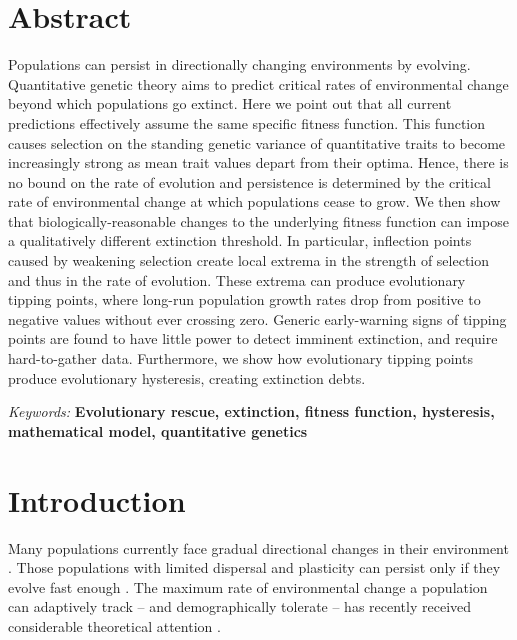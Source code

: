 \documentclass[12pt,letterpaper]{article} %
\begin{document}
\doublespacing
\linenumbers

\newpage
\setcounter{page}{1}
\pagestyle{fancy}

\normalsize

\section*{Abstract} %


Populations can persist in directionally changing environments by evolving. Quantitative genetic theory aims to predict critical rates of environmental change beyond which populations go extinct. Here we point out that all current predictions effectively assume the same specific fitness function. This function causes selection on the standing genetic variance of quantitative traits to become increasingly strong as mean trait values depart from their optima. Hence, there is no bound on the rate of evolution and persistence is determined by the critical rate of environmental change at which populations cease to grow. We then show that biologically-reasonable changes to the underlying fitness function can impose a qualitatively different extinction threshold. In particular, inflection points caused by weakening selection create local extrema in the strength of selection and thus in the rate of evolution. These extrema can produce evolutionary tipping points, where long-run population growth rates drop from positive to negative values without ever crossing zero. Generic early-warning signs of tipping points are found to have little power to detect imminent extinction, and require hard-to-gather data. Furthermore, we show how evolutionary tipping points produce evolutionary hysteresis, creating extinction debts. 

\noindent \textit{Keywords:} \textbf{Evolutionary rescue, extinction, fitness function, hysteresis, mathematical model, quantitative genetics}

\newpage
\section*{Introduction}

Many populations currently face gradual directional changes in their environment \citep[reviewed in][]{Davis2005,Parmesan2006,Visser2008,Lavergne2010,Hoffmann2011}.
Those populations with limited dispersal and plasticity can persist only if they evolve fast enough \citep{Lynch1993}.
The maximum rate of environmental change a population can adaptively track -- and demographically tolerate -- %
has recently received considerable theoretical attention \citep[reviewed in][]{Walters2012,Kopp2013,Alexander2014}. 
\end{document}
